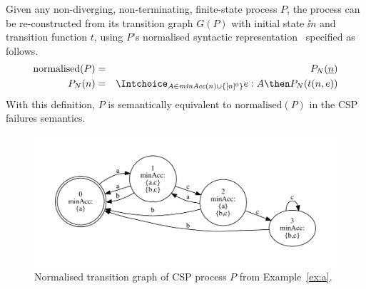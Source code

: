 Given any non-diverging, non-terminating, finite-state process $P$,
the process can be re-con\-struc\-ted from its transition graph $G(P)$ with initial state $\ii n$ and transition function $t$, using 
$P$'s normalised syntactic representation~\cite[pp.~277]{Roscoe:1997:TPC:550448} specified as follows.
\begin{eqnarray*}
\text{normalised}(P) & = & P_N(\ii n)
\\
P_N(n) & = & \Intchoice_{A\in\minaccs(n)\cup \{ [n]^0 \} } e:A\then P_N(t(n,e))
\end{eqnarray*}
With this definition, $P$ is semantically equivalent to $\text{normalised}(P)$ in the CSP failures semantics.


 \begin{figure}[t]
   \begin{center}
     \includegraphics[width=\textwidth]{p.pdf}
   \end{center}
   \caption{Normalised transition graph of CSP process $P$ from Example~\ref{ex:a}.}
   \label{fig:tga}
 \end{figure}




